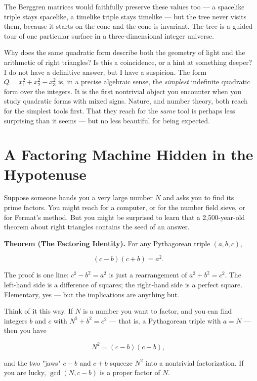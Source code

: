 \documentclass[11pt,twoside,openright]{book}
\theoremstyle{definition}
\theoremstyle{remark}
\begin{document}
The Berggren matrices would faithfully preserve these values too --- a spacelike triple stays spacelike, a timelike triple stays timelike --- but the tree never visits them, because it starts on the cone and the cone is invariant. The tree is a guided tour of one particular surface in a three-dimensional integer universe.


Why does the same quadratic form describe both the geometry of light and the arithmetic of right triangles? Is this a coincidence, or a hint at something deeper? I do not have a definitive answer, but I have a suspicion. The form $Q = x_1^2 + x_2^2 - x_3^2$ is, in a precise algebraic sense, the \textit{simplest} indefinite quadratic form over the integers. It is the first nontrivial object you encounter when you study quadratic forms with mixed signs. Nature, and number theory, both reach for the simplest tools first. That they reach for the \textit{same} tool is perhaps less surprising than it seems --- but no less beautiful for being expected.


\section{A Factoring Machine Hidden in the Hypotenuse}

Suppose someone hands you a very large number $N$ and asks you to find its prime factors. You might reach for a computer, or for the number field sieve, or for Fermat's method. But you might be surprised to learn that a 2,500-year-old theorem about right triangles contains the seed of an answer.

\textbf{Theorem (The Factoring Identity).} For any Pythagorean triple $(a, b, c)$,

\[(c - b)(c + b) = a^2.\]

The proof is one line: $c^2 - b^2 = a^2$ is just a rearrangement of $a^2 + b^2 = c^2$. The left-hand side is a difference of squares; the right-hand side is a perfect square. Elementary, yes --- but the implications are anything but.

Think of it this way. If $N$ is a number you want to factor, and you can find integers $b$ and $c$ with $N^2 + b^2 = c^2$ --- that is, a Pythagorean triple with $a = N$ --- then you have

\[N^2 = (c - b)(c + b),\]

and the two "jaws" $c - b$ and $c + b$ squeeze $N^2$ into a nontrivial factorization. If you are lucky, $\gcd(N, c - b)$ is a proper factor of $N$.
\end{document}
